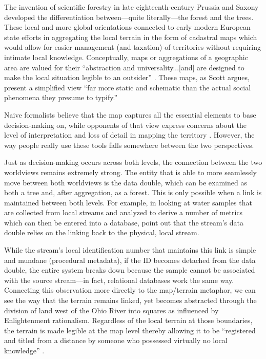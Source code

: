 The invention of scientific forestry in late eighteenth-century Prussia and Saxony developed the differentiation between---quite literally---the forest and the trees. These local and more global orientations connected to early modern European state efforts in aggregating the local terrain in the form of cadastral maps which would allow for easier management (and taxation) of territories without requiring intimate local knowledge. Conceptually, maps or aggregations of a geographic area are valued for their “abstraction and universality...[and] are designed to make the local situation legible to an outsider” \citep{Scott1998Seeing}. These maps, as Scott argues, present a simplified view “far more static and schematic than the actual social phenomena they presume to typify.”

Naive formalists believe that the map captures all the essential elements to base decision-making on, while opponents of that view express concerns about the level of interpretation and loss of detail in mapping the territory \citep{Berg1997OfForms}. However, the way people really use these tools falls somewhere between the two perspectives.

Just as decision-making occurs across both levels, the connection between the two worldviews remains extremely strong. The entity that is able to more seamlessly move between both worldviews is the data double, which can be examined as both a tree and, after aggregation, as a forest. This is only possible when a link is maintained between both levels. For example, in looking at water samples that are collected from local streams and analyzed to derive a number of metrics which can then be entered into a database, \cite{Ribes2013DataBite} point out that the stream’s data double relies on the linking back to the physical, local stream.

While the stream’s local identification number that maintains this link is simple and mundane (procedural metadata), if the ID becomes detached from the data double, the entire system breaks down because the sample cannot be associated with the source stream—in fact, relational databases work the same way. Connecting this observation more directly to the map/terrain metaphor, we can see the way that the terrain remains linked, yet becomes abstracted through the division of land west of the Ohio River into squares as influenced by Enlightenment rationalism. Regardless of the local terrain at those boundaries, the terrain is made legible at the map level thereby allowing it to be “registered and titled from a distance by someone who possessed virtually no local knowledge” \citep{Scott1998Seeing}.

